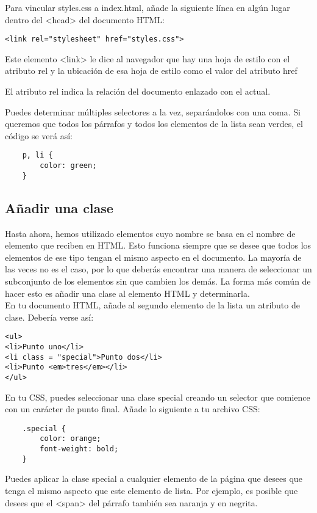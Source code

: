 Para vincular styles.css a index.html, añade la siguiente línea en algún lugar dentro del <head> del documento HTML:

\begin{lstlisting}
<link rel="stylesheet" href="styles.css">
\end{lstlisting}

Este elemento <link> le dice al navegador que hay una hoja de estilo con el atributo rel y la ubicación de esa hoja de estilo como el valor del atributo href
\begin{remark}
	El atributo rel indica la relación del documento enlazado con el actual.
\end{remark}

Puedes determinar múltiples selectores a la vez, separándolos con una coma. Si queremos que todos los párrafos y todos los elementos de la lista sean verdes, el código se verá así:

\begin{lstlisting}
	p, li {
		color: green;
	}
\end{lstlisting}

\subsection{Añadir una clase}
Hasta ahora, hemos utilizado elementos cuyo nombre se basa en el nombre de elemento que reciben en HTML. Esto funciona siempre que se desee que todos los elementos de ese tipo tengan el mismo aspecto en el documento. La mayoría de las veces no es el caso, por lo que deberás encontrar una manera de seleccionar un subconjunto de los elementos sin que cambien los demás. La forma más común de hacer esto es añadir una clase al elemento HTML y determinarla.
\\
En tu documento HTML, añade al segundo elemento de la lista un atributo de clase. Debería verse así:
\begin{lstlisting}
<ul>
<li>Punto uno</li>
<li class = "special">Punto dos</li>
<li>Punto <em>tres</em></li>
</ul>
\end{lstlisting}
En tu CSS, puedes seleccionar una clase special creando un selector que comience con un carácter de punto final. Añade lo siguiente a tu archivo CSS:
\begin{lstlisting}
	.special {
		color: orange;
		font-weight: bold;
	}
\end{lstlisting}

Puedes aplicar la clase special a cualquier elemento de la página que desees que tenga el mismo aspecto que este elemento de lista. Por ejemplo, es posible que desees que el <span> del párrafo también sea naranja y en negrita. 


